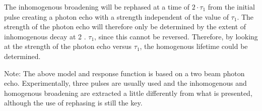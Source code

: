 \documentclass[12pt]{article}
\begin{document}
The inhomogenous broadening will be rephased at a time of $2 \cdot \tau_{1}$ from the initial pulse creating a photon echo with a strength independent of the value of $\tau_{1}$. The strength of the photon echo will therefore only be determined by the extent of inhomogenous decay at 2 . $\tau_{1}$, since this cannot be reversed. Therefore, by looking at the strength of the photon echo versus $\tau_{1}$, the homogenous lifetime could be determined.

Note: The above model and response function is based on a two beam photon echo. Experimentally, three pulses are usually used and the inhomogenous and homogenous broadening are extracted a little differently from what is presented, although the use of rephasing is still the key.
\end{document}

